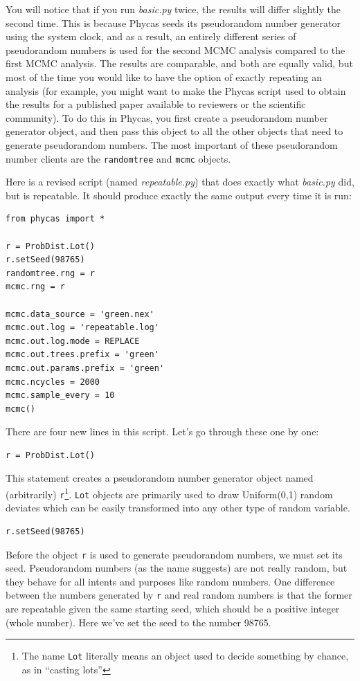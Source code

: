 \documentclass[10pt]{article}
\newcommand{\pathname}[1]{{\em #1}}				%
\newcommand{\objectname}[1]{{\tt #1}}				%
\newcommand{\classname}[1]{{\tt #1}}				%
\newcommand{\code}[1]{{\tt #1}}					%
\begin{document}
You will notice that if you run \pathname{basic.py} twice, the results will differ slightly the second time. This is because Phycas seeds its pseudorandom number generator using the system clock, and as a result, an entirely different series of pseudorandom numbers is used for the second MCMC analysis compared to the first MCMC analysis. The results are comparable, and both are equally valid, but most of the time you would like to have the option of exactly repeating an analysis (for example, you might want to make the Phycas script used to obtain the results for a published paper available to reviewers or the scientific community). To do this in Phycas, you first create a pseudorandom number generator object, and then pass this object to all the other objects that need to generate pseudorandom numbers. The most important of these pseudorandom number clients are the \objectname{randomtree} and \objectname{mcmc} objects.

Here is a revised script (named \pathname{repeatable.py}) that does exactly what \pathname{basic.py} did, but is repeatable. It should produce exactly the same output every time it is run:
\begin{verbatim}
from phycas import *

r = ProbDist.Lot()
r.setSeed(98765)
randomtree.rng = r
mcmc.rng = r

mcmc.data_source = 'green.nex'
mcmc.out.log = 'repeatable.log'
mcmc.out.log.mode = REPLACE
mcmc.out.trees.prefix = 'green'
mcmc.out.params.prefix = 'green'
mcmc.ncycles = 2000
mcmc.sample_every = 10
mcmc()
\end{verbatim}
There are four new lines in this script. Let's go through these one by one:

\begin{samepage}
\begin{verbatim}
r = ProbDist.Lot()
\end{verbatim}
This statement creates a pseudorandom number generator object named (arbitrarily) \code{r}\footnote{The name \classname{Lot} literally means an object used to decide something by chance, as in ``casting lots''}. \classname{Lot} objects are primarily used to draw Uniform(0,1) random deviates which can be easily transformed into any other type of random variable.
\end{samepage}

\begin{samepage}
\begin{verbatim}
r.setSeed(98765)
\end{verbatim}
Before the object \code{r} is used to generate pseudorandom numbers, we must set its seed. Pseudorandom numbers (as the name suggests) are not really random, but they behave for all intents and purposes like random numbers. One difference between the numbers generated by \code{r} and real random numbers is that the former are repeatable given the same starting seed, which should be a positive integer (whole number). Here we've set the seed to the number 98765.
\end{samepage}
\end{document}
